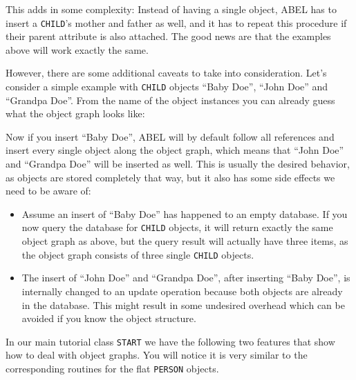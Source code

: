 \documentclass[a4paper,12pt]{report}
\begin{document}
This adds in some complexity: 
Instead of having a single object, ABEL has to insert a \lstinline!CHILD!'s mother and father as well, and it has to repeat this procedure if their parent attribute is also attached. 
The good news are that the examples above will work exactly the same.

However, there are some additional caveats to take into consideration. 
Let's consider a simple example with \lstinline!CHILD! objects ``Baby Doe'', ``John Doe'' and ``Grandpa Doe''.
From the name of the object instances you can already guess what the object graph looks like: 

	\begin{center}
	\end{center}

Now if you insert ``Baby Doe'', ABEL will by default follow all references and insert every single object along the object graph, which means that ``John Doe'' and ``Grandpa Doe'' will be inserted as well.
This is usually the desired behavior, as objects are stored completely that way, but it also has some side effects we need to be aware of:

\begin{itemize}
\item Assume an insert of ``Baby Doe'' has happened to an empty database. 
If you now query the database for \lstinline!CHILD! objects, it will return exactly the same object graph as above, 
but the query result will actually have three items, as the object graph consists of three single \lstinline!CHILD! objects.
	
\item The insert of ``John Doe'' and ``Grandpa Doe'', after inserting ``Baby Doe'', is internally changed to an update operation because both objects are already in the database.
This might result in some undesired overhead which can be avoided if you know the object structure.
\end{itemize}

In our main tutorial class \lstinline{START} we have the following two features that show how to deal with object graphs. 
You will notice it is very similar to the corresponding routines for the flat \lstinline!PERSON! objects.
\end{document}
